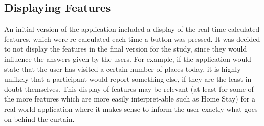 \subsection{Displaying Features}
An initial version of the application included a display of the real-time calculated features, which were re-calculated each time a button was pressed. It was decided to not display the features in the final version for the study, since they would influence the answers given by the users. For example, if the application would state that the user has visited a certain number of places today, it is highly unlikely that a participant would report something else, if they are the least in doubt themselves. This display of features may be relevant (at least for some of the more features which are more easily interpret-able such as Home Stay) for a real-world application where it makes sense to inform the user exactly what goes on behind the curtain.
